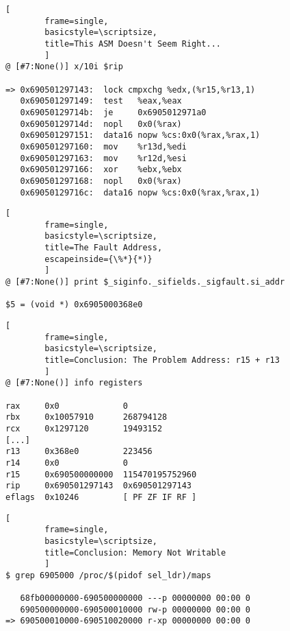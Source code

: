 \documentclass[compress,red]{beamer}
\begin{document}
\pagebreak
\begin{lstlisting}[
        frame=single,
        basicstyle=\scriptsize,
        title=This ASM Doesn't Seem Right...
        ]
@ [#7:None()] x/10i $rip

=> 0x690501297143:  lock cmpxchg %edx,(%r15,%r13,1)
   0x690501297149:  test   %eax,%eax
   0x69050129714b:  je     0x6905012971a0
   0x69050129714d:  nopl   0x0(%rax)
   0x690501297151:  data16 nopw %cs:0x0(%rax,%rax,1)
   0x690501297160:  mov    %r13d,%edi
   0x690501297163:  mov    %r12d,%esi
   0x690501297166:  xor    %ebx,%ebx
   0x690501297168:  nopl   0x0(%rax)
   0x69050129716c:  data16 nopw %cs:0x0(%rax,%rax,1)
\end{lstlisting}
\newpage

\pagebreak
\begin{lstlisting}[
        frame=single,
        basicstyle=\scriptsize,
        title=The Fault Address,
        escapeinside={\%*}{*)}
        ]
@ [#7:None()] print $_siginfo._sifields._sigfault.si_addr

$5 = (void *) 0x6905000368e0
\end{lstlisting}
\newpage

\pagebreak
\begin{lstlisting}[
        frame=single,
        basicstyle=\scriptsize,
        title=Conclusion: The Problem Address: r15 + r13
        ]
@ [#7:None()] info registers

rax     0x0             0
rbx     0x10057910      268794128
rcx     0x1297120       19493152
[...]
r13     0x368e0         223456
r14     0x0             0
r15     0x690500000000  115470195752960
rip     0x690501297143  0x690501297143
eflags  0x10246         [ PF ZF IF RF ]
\end{lstlisting}
\newpage

\pagebreak
\begin{lstlisting}[
        frame=single,
        basicstyle=\scriptsize,
        title=Conclusion: Memory Not Writable
        ]
$ grep 6905000 /proc/$(pidof sel_ldr)/maps

   68fb00000000-690500000000 ---p 00000000 00:00 0
   690500000000-690500010000 rw-p 00000000 00:00 0
=> 690500010000-690510020000 r-xp 00000000 00:00 0
\end{lstlisting}
\newpage
\end{document}
